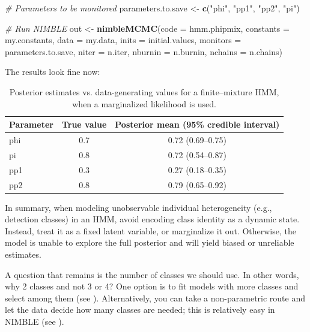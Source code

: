 \documentclass[
  12pt,
]{krantz}
\newenvironment{Shaded}{\begin{snugshade}}{\end{snugshade}}
\newcommand{\AttributeTok}[1]{\textcolor[rgb]{0.13,0.29,0.53}{#1}}
\newcommand{\CommentTok}[1]{\textcolor[rgb]{0.56,0.35,0.01}{\textit{#1}}}
\newcommand{\FunctionTok}[1]{\textcolor[rgb]{0.13,0.29,0.53}{\textbf{#1}}}
\newcommand{\NormalTok}[1]{#1}
\newcommand{\OtherTok}[1]{\textcolor[rgb]{0.56,0.35,0.01}{#1}}
\newcommand{\StringTok}[1]{\textcolor[rgb]{0.31,0.60,0.02}{#1}}
\begin{document}
\begin{Shaded}
\begin{Highlighting}[]
\CommentTok{\# Parameters to be monitored}
\NormalTok{parameters.to.save }\OtherTok{\textless{}{-}} \FunctionTok{c}\NormalTok{(}\StringTok{"phi"}\NormalTok{, }\StringTok{"pp1"}\NormalTok{, }\StringTok{"pp2"}\NormalTok{, }\StringTok{"pi"}\NormalTok{)}

\CommentTok{\# Run NIMBLE}
\NormalTok{out }\OtherTok{\textless{}{-}} \FunctionTok{nimbleMCMC}\NormalTok{(}\AttributeTok{code =}\NormalTok{ hmm.phipmix, }
                  \AttributeTok{constants =}\NormalTok{ my.constants,}
                  \AttributeTok{data =}\NormalTok{ my.data,              }
                  \AttributeTok{inits =}\NormalTok{ initial.values,}
                  \AttributeTok{monitors =}\NormalTok{ parameters.to.save,}
                  \AttributeTok{niter =}\NormalTok{ n.iter,}
                  \AttributeTok{nburnin =}\NormalTok{ n.burnin, }
                  \AttributeTok{nchains =}\NormalTok{ n.chains)}
\end{Highlighting}
\end{Shaded}

The results look fine now:

\begin{table}

\caption{\label{tab:unnamed-chunk-412}Posterior estimates vs. data-generating values for a finite--mixture HMM, when a marginalized likelihood is used.}
\centering
\begin{tabular}[t]{l|c|c}
\hline
Parameter & True value & Posterior mean (95\% credible interval)\\
\hline
phi & 0.7 & 0.72 (0.69–0.75)\\
\hline
pi & 0.8 & 0.72 (0.54–0.87)\\
\hline
pp1 & 0.3 & 0.27 (0.18–0.35)\\
\hline
pp2 & 0.8 & 0.79 (0.65–0.92)\\
\hline
\end{tabular}
\end{table}

In summary, when modeling unobservable individual heterogeneity (e.g., detection classes) in an HMM, avoid encoding class identity as a dynamic state. Instead, treat it as a fixed latent variable, or marginalize it out. Otherwise, the model is unable to explore the full posterior and will yield biased or unreliable estimates.

A question that remains is the number of classes we should use. In other words, why 2 classes and not 3 or 4? One option is to fit models with more classes and select among them (see \citet{cubaynes2012}). Alternatively, you can take a non-parametric route and let the data decide how many classes are needed; this is relatively easy in NIMBLE (see \citet{turek_bayesian_2021}).
\end{document}
